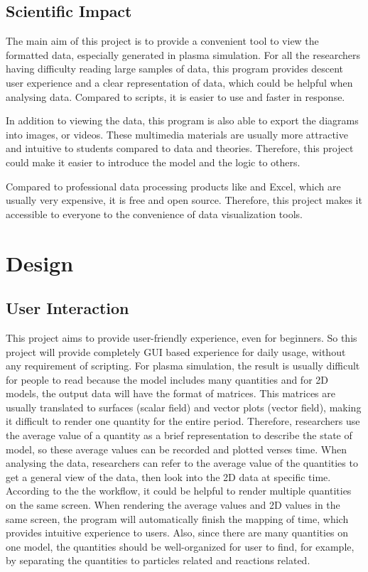 \subsection{Scientific Impact}

The main aim of this project is to provide a convenient tool to view the formatted data, especially generated in plasma simulation. For all the researchers having difficulty reading large samples of data, this program provides descent user experience and a clear representation of data, which could be helpful when analysing data. Compared to \MatLab{} scripts, it is easier to use and faster in response.

In addition to viewing the data, this program is also able to export the diagrams into images, or videos. These multimedia materials are usually more attractive and intuitive to students compared to data and theories. Therefore, this project could make it easier to introduce the model and the logic to others.

Compared to professional data processing products like \MatLab{} and Excel, which are usually very expensive, it is free and open source. Therefore, this project makes it accessible to everyone to the convenience of data visualization tools.

\section{Design}

\subsection{User Interaction}

This project aims to provide user-friendly experience, even for beginners. So this project will provide completely GUI based experience for daily usage, without any requirement of scripting. For plasma simulation, the result is usually difficult for people to read because the model includes many quantities and for 2D models, the output data will have the format of matrices. This matrices are usually translated to surfaces (scalar field) and vector plots (vector field), making it difficult to render one quantity for the entire period. Therefore, researchers use the average value of a quantity as a brief representation to describe the state of model, so these average values can be recorded and plotted verses time. When analysing the data, researchers can refer to the average value of the quantities to get a general view of the data, then look into the 2D data at specific time. According to the the workflow, it could be helpful to render multiple quantities on the same screen. When rendering the average values and 2D values in the same screen, the program will automatically finish the mapping of time, which provides intuitive experience to users. Also, since there are many quantities on one model, the quantities should be well-organized for user to find, for example, by separating the quantities to particles related and reactions related.

